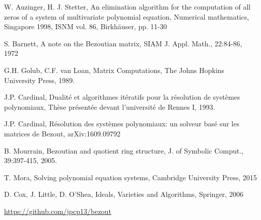 \documentclass{standalone}
\begin{document}
  \begin{thebibliography}{00}

  {W. Auzinger, H. J. Stetter},
  {An elimination algorithm for the computation of all zeros of a system of multivariate polynomial equation},
  {Numerical mathematics, Singapore 1998, ISNM vol. 86, Birkhäuser, pp. 11-30}

  {S. Barnett}, {A note on the Bezoutian matrix},
  {SIAM J. Appl. Math., 22:84-86}, {1972}

  {G.H. Golub, C.F. van Loan},
  {Matrix Computations}, {The Johns Hopkins University Press}, {1989}.

  {J.P. Cardinal}, 
  {Dualit\'e et algorithmes it\'eratifs pour la r\'esolution de syst\`emes polynomiaux}, 
  {Th\`ese pr\'esent\'ee devant l'universit\'e de Rennes I}, {1993}.

  {J.P. Cardinal}, 
  {R\'esolution des syst\`emes polynomiaux: un solveur bas\'e sur les matrices de Bezout},
  {arXiv:1609.09792}
 	
  {B. Mourrain}, {Bezoutian and quotient ring structure},
  {J. of Symbolic Comput., 39:397-415}, {2005}.

  {T. Mora}, {Solving polynomial equation systems}, {Cambridge University Press}, {2015}

  {D. Cox, J. Little, D. O'Shea},
  {Ideals, Varieties and Algorithms}, {Springer}, {2006}

  \url{https://github.com/jpcp13/bezout}

  \end{thebibliography}
\end{document}
